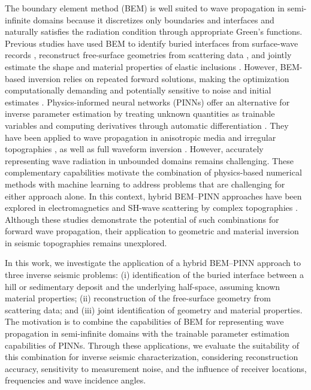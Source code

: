 \documentclass[11pt,twoside]{article}
\begin{document}
The boundary element method (BEM) is well suited to wave propagation in semi-infinite domains because it discretizes only boundaries and interfaces and naturally satisfies the radiation condition through appropriate Green's functions. Previous studies have used BEM to identify buried interfaces from surface-wave records \citep{Bignardi2012}, reconstruct free-surface geometries from scattering data \citep{Wang2018}, and jointly estimate the shape and material properties of elastic inclusions \citep{Bonnet2009}. However, BEM-based inversion relies on repeated forward solutions, making the optimization computationally demanding and potentially sensitive to noise and initial estimates \citep{Kallivokas2009,Chien2005}. Physics-informed neural networks (PINNs) offer an alternative for inverse parameter estimation by treating unknown quantities as trainable variables and computing derivatives through automatic differentiation \citep{Raissi2019}. They have been applied to wave propagation in anisotropic media and irregular topographies \citep{Song2022}, as well as full waveform inversion \citep{RashtBehesht2022}. However, accurately representing wave radiation in unbounded domains remains challenging. These complementary capabilities motivate the combination of physics-based numerical methods with machine learning to address problems that are challenging for either approach alone. In this context, hybrid BEM–PINN approaches have been explored in electromagnetics \citep{Barmada2024} and SH-wave scattering by complex topographies \citep{wu_novel_2026}. Although these studies demonstrate the potential of such combinations for forward wave propagation, their application to geometric and material inversion in seismic topographies remains unexplored.

In this work, we investigate the application of a hybrid BEM–PINN approach to three inverse seismic problems: (i) identification of the buried interface between a hill or sedimentary deposit and the underlying half-space, assuming known material properties; (ii) reconstruction of the free-surface geometry from scattering data; and (iii) joint identification of geometry and material properties. The motivation is to combine the capabilities of BEM for representing wave propagation in semi-infinite domains with the trainable parameter estimation capabilities of PINNs. Through these applications, we evaluate the suitability of this combination for inverse seismic characterization, considering reconstruction accuracy, sensitivity to measurement noise, and the influence of receiver locations, frequencies and wave incidence angles.
\end{document}
